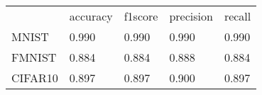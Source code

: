 \begin{tabular}{lllll}
 & accuracy & f1score & precision & recall \\
MNIST & 0.990 & 0.990 & 0.990 & 0.990 \\
FMNIST & 0.884 & 0.884 & 0.888 & 0.884 \\
CIFAR10 & 0.897 & 0.897 & 0.900 & 0.897 \\
\end{tabular}
